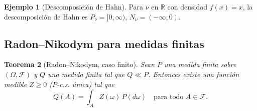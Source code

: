 \documentclass[11pt,a4paper]{article}
\theoremstyle{plain}
\newtheorem{theorem}{Teorema}[section]
\theoremstyle{definition}
\newtheorem{example}[theorem]{Ejemplo}
\theoremstyle{remark}
\newcommand{\1}{\mathbf{1}}
\newcommand{\RR}{\mathbb{R}}
\newcommand{\cF}{\mathcal{F}}
\begin{document}
\begin{example}[Descomposición de Hahn]
Para $\nu$ en $\RR$ con densidad $f(x)=x$, la descomposición de Hahn es $P_\nu=[0,\infty)$, $N_\nu=(-\infty,0)$.
\end{example}

\subsection{Radon--Nikodym para medidas finitas}

\begin{theorem}[Radon--Nikodym, caso finito]
\label{thm:RNfinite}
Sean $P$ una medida finita sobre $(\Omega,\cF)$ y $Q$ una medida finita tal que $Q\ll P$.
Entonces existe una función medible $Z\ge0$ ($P$-c.s. única) tal que
\[
Q(A)=\int_A Z(\omega)\,P(d\omega)\quad\text{para todo }A\in\cF.
\]
\end{theorem}
\end{document}
